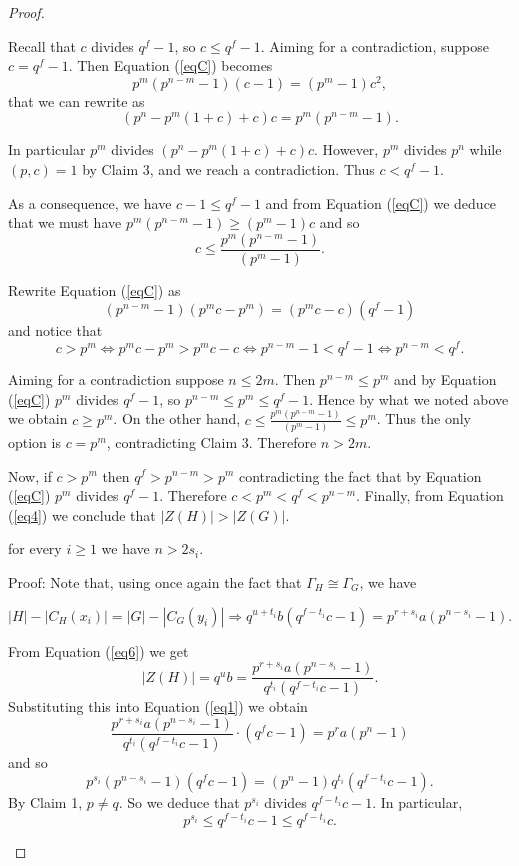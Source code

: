 \documentclass[12pt]{amsart}
\theoremstyle{definition}
\theoremstyle{remark}
\theoremstyle{plain}
\theoremstyle{plain}
\theoremstyle{plain}
\theoremstyle{plain}
\theoremstyle{plain}
\theoremstyle{remark}
\theoremstyle{remark}
\theoremstyle{definition}
\begin{document}
\begin{proof}
\begin{description}
Recall that $c$ divides $q^f-1$, so $c \leq q^f-1$. Aiming for a contradiction, suppose $c=q^f-1$. Then Equation (\ref{eqC}) becomes
\[ p^{m}(p^{n-m}- 1)(c - 1)= (p^{m}- 1)c^2 , \]
that we can rewrite as
\[(p^n- p^m(1+c) +c)c = p^{m}(p^{n-m}- 1). \]

In particular $p^m$ divides $(p^n- p^m(1+c) +c)c $. However, $p^m$ divides $p^n$ while $(p,c)=1$ by Claim 3, and we reach a contradiction. Thus $c<q^f-1$.

As a consequence, we have $c-1 \leq q^f-1$ and from Equation (\ref{eqC}) we deduce that we must have $p^{m}(p^{n-m}- 1) \geq (p^{m}- 1)c$ and so 
\[c \leq \frac{p^{m}(p^{n-m}- 1)}{ (p^{m}- 1)}. \]

Rewrite Equation (\ref{eqC}) as
$$(p^{n-m}- 1)(p^mc - p^m)= (p^{m}c- c)(q^f - 1)$$
and notice that
$$c > p^m \Leftrightarrow p^mc - p^m > p^mc - c \Leftrightarrow p^{n-m}-1 < q^f-1
\Leftrightarrow p^{n-m} < q^f.$$  

Aiming for a contradiction suppose $n \leq 2m$. Then $p^{n-m} \leq p^m$ and by Equation (\ref{eqC}) $p^m$ divides $q^f-1$, so $p^{n-m} \leq p^m \leq q^f-1$.
Hence by what we noted above we obtain $c \geq p^m$. On the other hand, $c \leq \frac{p^{m}(p^{n-m}- 1)}{ (p^{m}- 1)} \leq p^m$. Thus the only option is $c=p^m$, contradicting Claim 3. Therefore $n > 2m$.

Now, if $c > p^m$ then $q^f > p^{n-m} > p^m$ contradicting the fact that by Equation (\ref{eqC}) $p^m$ divides $q^f-1$. Therefore $c < p^m < q^f < p^{n-m}$. Finally, from Equation (\ref{eq4}) we conclude that $|Z(H)| > |Z(G)|$.


\bigskip
\item[Claim 5] for every $i\geq 1$ we have $n > 2s_i$.

\smallskip
\noindent
Proof: 
Note that, using once again the fact that $\Gamma_H \cong \Gamma_G$, we have

\begin{equation}\label{eq6} |H| - |C_H(x_i)| = |G| - |C_G(y_i)| \Longrightarrow 
q^{u+t_i}b(q^{f-t_i}c - 1) = p^{r+s_i}a(p^{n-s_i} - 1). \end{equation}

From Equation (\ref{eq6}) we get
\[ |Z(H)| = q^ub = \frac{p^{r+s_i}a(p^{n-s_i}- 1)}{q^{t_i}(q^{f-t_i}c - 1)}.\]
Substituting this into Equation (\ref{eq1}) we obtain
\[ \frac{p^{r+s_i}a(p^{n-s_i}- 1)}{q^{t_i}(q^{f-t_i}c - 1)}\cdot (q^fc - 1)= p^{r}a(p^{n}- 1) \]
and so 
\[ p^{s_i}(p^{n-s_i}- 1)(q^fc - 1) = (p^{n}- 1)q^{t_i}(q^{f-t_i}c - 1). \]
By Claim 1, $p\neq q$. So we deduce that $p^{s_i}$ divides $q^{f-t_i}c - 1$. In particular, 
\begin{equation}\label{last}
p^{s_i} \leq q^{f-t_i}c - 1 \leq q^{f-t_i}c.
\end{equation}


\end{description}
\end{proof}
\end{document}
